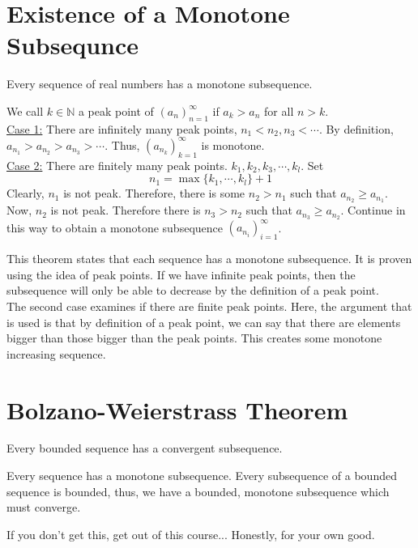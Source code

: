 \documentclass[12pt]{article}
\begin{document}
\section{Existence of a Monotone Subsequnce}
\begin{theo}{}
    Every sequence of real numbers has a monotone subsequence.
\end{theo}
\begin{prf}{}
We call $k \in \mathbb N$ a peak point of $(a_n)_{n=1}^\infty$ if $a_k > a_n$ for all $n > k$. \\
\underline{Case 1:} There are infinitely many peak points, $n_1 < n_2, n_3 < \cdots$. By definition, $a_{n_1} > a_{n_2} > a_{n_3} >  \cdots$. Thus, $(a_{n_k})_{k=1}^\infty$ is monotone.\\
\underline{Case 2:} There are finitely many peak points. $k_1, k_2, k_3, \cdots, k_l$. Set $$n_1 = \max\{k_1, \cdots, k_l\} + 1$$ Clearly, $n_1$ is not peak. Therefore, there is some $n_2 > n_1$ such that $a_{n_2} \ge a_{n_1}$. Now, $n_2$ is not peak. Therefore there is $n_3 > n_2$ such that $a_{n_3} \ge a_{n_2}$. Continue in this way to obtain a monotone subsequence $(a_{n_i})_{i=1}^\infty$.
\end{prf}
\begin{explanation}{}
    This theorem states that each sequence has a monotone subsequence. It is proven using the idea of peak points. If we have infinite peak points, then the subsequence will only be able to decrease by the definition of a peak point.\\
    The second case examines if there are finite peak points. Here, the argument that is used is that by definition of a peak point, we can say that there are elements bigger than those bigger than the peak points. This creates some monotone increasing sequence.     
\end{explanation}



\section{Bolzano-Weierstrass Theorem}
\begin{theo}{}
    Every bounded sequence has a convergent subsequence.
\end{theo}
\begin{prf}{}
    Every sequence has a monotone subsequence. Every subsequence of a bounded sequence is bounded, thus, we have a bounded, monotone subsequence which must converge. 
\end{prf}
\begin{explanation}{}
    If you don't get this, get out of this course... Honestly, for your own good.
\end{explanation}
\end{document}
